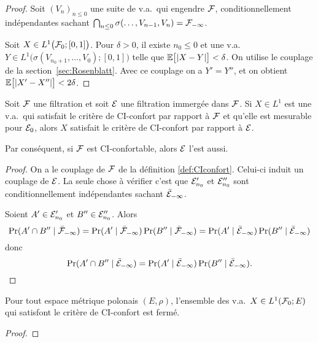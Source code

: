 \documentclass[12pt,a4paper]{article}
\begin{document}
\begin{proof}
Soit ${(V_n)}_{n \leq 0}$ une suite de v.a.\ qui engendre $\mathcal{F}$, 
 conditionnellement indépendantes 
sachant $\bigcap_{n \leq 0}\sigma(\ldots, V_{n-1}, V_n) = \mathcal{F}_{-\infty}$. 

Soit $X \in L^1\bigl(\mathcal{F}_0; [0,1]\bigr)$. Pour $\delta>0$, il existe 
$n_0 \leq 0$ et une v.a.\ $Y \in L^1\bigl(\sigma(V_{n_0+1},\ldots, V_0); [0,1]\bigr)$ 
telle que $\mathbb{E}\bigl[|X-Y|\bigr] < \delta$. 
On utilise le couplage de la section~\ref{sec:Rosenblatt}. 
Avec ce couplage on a $Y'=Y''$, et on obtient 
$\mathbb{E}\bigl[|X'-X''|\bigr] < 2\delta$. 
\end{proof}


\begin{ppsition}
Soit $\mathcal{F}$ une filtration et soit $\mathcal{E}$ une filtration immergée dans $\mathcal{F}$. 
Si $X \in L^1$ est une v.a.\ qui satisfait le critère de CI-confort par rapport à $\mathcal{F}$ 
et qu'elle est mesurable pour 
$\mathcal{E}_0$, alors $X$ satisfait le critère de CI-confort par rapport à $\mathcal{E}$. 

Par conséquent, si $\mathcal{F}$ est CI-confortable, alors $\mathcal{E}$ l'est aussi. 
\end{ppsition}

\begin{proof}
On a le couplage de $\mathcal{F}$ de la définition \ref{def:CIconfort}. 
Celui-ci induit un couplage de $\mathcal{E}$. 
La seule chose à vérifier c'est que $\mathcal{E}'_{n_0}$ et $\mathcal{E}''_{n_0}$ sont 
conditionnellement indépendantes sachant $\bar{\mathcal{E}}_{-\infty}$.

Soient $A' \in \mathcal{E}'_{n_0}$ et $B'' \in \mathcal{E}''_{n_0}$. 
Alors  
$$
\Pr(A' \cap B'' \mid \bar{\mathcal{F}}_{-\infty})
= \Pr(A' \mid \bar{\mathcal{F}}_{-\infty})\Pr(B'' \mid \bar{\mathcal{F}}_{-\infty})
= \Pr(A' \mid \bar{\mathcal{E}}_{-\infty})\Pr(B'' \mid \bar{\mathcal{E}}_{-\infty})
$$
donc
$$
\Pr(A' \cap B'' \mid \bar{\mathcal{E}}_{-\infty})
= \Pr(A' \mid \bar{\mathcal{E}}_{-\infty})\Pr(B'' \mid \bar{\mathcal{E}}_{-\infty}).
$$

\end{proof}


\begin{ppsition}\label{ppsition:CIferme}
Pour tout espace métrique polonais $(E,\rho)$, 
l'ensemble des v.a.\ $X \in L^1(\mathcal{F}_0; E)$ qui satisfont le critère de CI-confort est fermé. 
\end{ppsition}

\begin{proof}

\end{proof}
\end{document}
